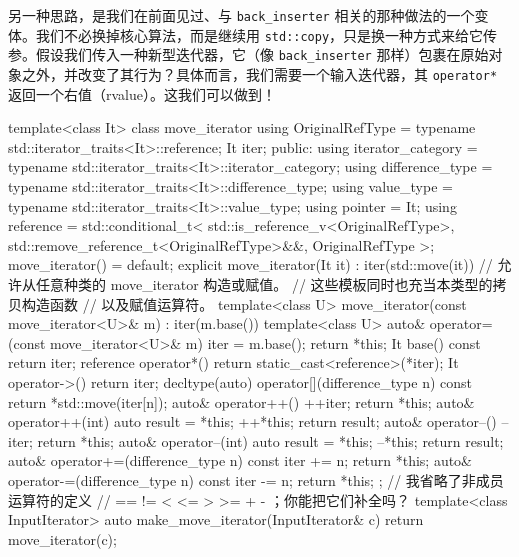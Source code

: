 另一种思路，是我们在前面见过、与 \texttt{back\_\allowbreak{}inserter} 相关的那种做法的一个变体。我们不必换掉核心算法，而是继续用 \texttt{std::\allowbreak{}copy}，只是换一种方式来给它传参。假设我们传入一种新型迭代器，它（像 \texttt{back\_\allowbreak{}inserter} 那样）包裹在原始对象之外，并改变了其行为？具体而言，我们需要一个输入迭代器，其 \texttt{operator*} 返回一个右值（rvalue）。这我们可以做到！

\begin{codebox}[cpp]
    template<class It>
    class move_iterator {
      using OriginalRefType = typename std::iterator_traits<It>::reference;
      It iter;
      public:
       using iterator_category = typename
         std::iterator_traits<It>::iterator_category;
       using difference_type = typename
         std::iterator_traits<It>::difference_type;
       using value_type = typename std::iterator_traits<It>::value_type;
       using pointer = It;
       using reference = std::conditional_t<
         std::is_reference_v<OriginalRefType>,
         std::remove_reference_t<OriginalRefType>&&,
         OriginalRefType
         >;
       move_iterator() = default;
       explicit move_iterator(It it) : iter(std::move(it)) {}
       // 允许从任意种类的 move_iterator 构造或赋值。
       // 这些模板同时也充当本类型的拷贝构造函数
       // 以及赋值运算符。
       template<class U>
       move_iterator(const move_iterator<U>& m) : iter(m.base()) {}
       template<class U>
       auto& operator=(const move_iterator<U>& m)
         { iter = m.base(); return *this; }
       It base() const { return iter; }
       reference operator*() { return static_cast<reference>(*iter); }
       It operator->() { return iter; }
       decltype(auto) operator[](difference_type n) const
         { return *std::move(iter[n]); }
      auto& operator++() { ++iter; return *this; }
      auto& operator++(int)
        { auto result = *this; ++*this; return result; }
      auto& operator--() { --iter; return *this; }
      auto& operator--(int)
        { auto result = *this; --*this; return result; }
      auto& operator+=(difference_type n) const
        { iter += n; return *this; }
      auto& operator-=(difference_type n) const
        { iter -= n; return *this; }
    };
    // 我省略了非成员运算符的定义
    // == != < <= > >= + - ；你能把它们补全吗？
    template<class InputIterator>
    auto make_move_iterator(InputIterator& c)
    {
      return move_iterator(c);
    }
\end{codebox}

